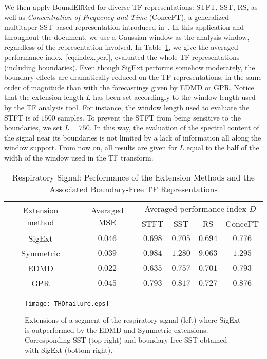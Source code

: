 We then apply {\sf BoundEffRed} for diverse TF representations: STFT, SST, RS, as well as \textit{Concentration of Frequency and Time} (ConceFT), a generalized multitaper SST-based representation introduced in~\cite{Daubechies16conceft}. In this application and throughout the document, we use a Gaussian window as the analysis window, regardless of the representation involved. In Table~\ref{tab:THO}, we give the averaged performance index~\eqref{eq:index.perf}, evaluated the whole TF representations (including boundaries). Even though {\sf SigExt} performs somehow moderately, the boundary effects are dramatically reduced on the TF representations, in the same order of magnitude than with the forecastings given by EDMD or GPR. Notice that the extension length $L$ has been set accordingly to the window length used by the TF analysis tool. For instance, the window length used to evaluate the STFT is of $1500$ samples. To prevent the STFT from being sensitive to the boundaries, we set $L=750$. In this way, the evaluation of the spectral content of the signal near its boundaries is not limited by a lack of information all along the window support. From now on, all results are given for $L$ equal to the half of the width of the window used in the TF transform.

\begin{table}
\centering
\caption{Respiratory Signal: Performance of the Extension Methods and the Associated Boundary-Free TF Representations}
\begin{tabular}{|c||c||c|c|c|c|}
  \hline
   \multirow{2}{40pt}{\centering Extension method} & \multirow{2}{35pt}{\centering Averaged MSE} & \multicolumn{4}{c|}{Averaged performance index $D$} \\
   \cline{3-6}
      & & STFT & SST & RS & ConceFT \\
   \hhline{|=#=#=|=|=|=|}
   {\sf SigExt} & $0.046$ & $0.698$ &  $0.705$ & $0.694$ & $0.776$ \\
   \hline
   Symmetric & $0.039$ & $0.984$ & $1.280$ & $9.063$ & $1.295$ \\
   \hline
   EDMD & $0.022$ & $0.635$ &  $0.757$ & $0.701$ & $0.793$ \\
   \hline
   GPR & $0.045$ & $0.793$ &  $0.817$ & $0.727$ & $0.876$ \\ 
   \hline
\end{tabular}
\label{tab:THO}
\end{table}

\begin{figure}
\centering
\texttt{[image: THOfailure.eps]}
\caption{Extensions of a segment of the respiratory signal (left) where {\sf SigExt} is outperformed by the EDMD and Symmetric extensions. Corresponding SST (top-right) and boundary-free SST obtained with {\sf SigExt} (bottom-right).}
\label{fig:THO.failure}
\end{figure} 


